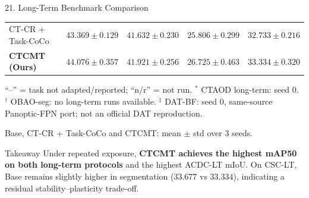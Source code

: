 \documentclass[aspectratio=169,11pt]{beamer}
\begin{document}
\begin{frame}{21. Long-Term Benchmark Comparison}
\begin{tabular}{lcccc}
CT-CR + Task-CoCo
& $43.369\pm0.129$
& $41.632\pm0.230$
& $25.806\pm0.299$
& $32.733\pm0.216$
\\

\textbf{CTCMT (Ours)}
& $\mathbf{44.076\pm0.357}$
& $\mathbf{41.921\pm0.256}$
& $\mathbf{26.725\pm0.463}$
& $33.334\pm0.320$
\\

\bottomrule
\end{tabular}

\vspace{0.02cm}

{\fontsize{5.2}{5.8}\selectfont
\raggedright

``--'' = task not adapted/reported; ``n/r'' = not run.
$^\ast$ CTAOD long-term: seed 0.
$^\dagger$ OBAO-seg: no long-term runs available.
$^\ddagger$ DAT-BF: seed 0, same-source Panoptic-FPN port; not an official DAT reproduction.

Base, CT-CR + Task-CoCo and CTCMT: mean $\pm$ std over 3 seeds.
\par
}

\vspace{-0.04cm}

\begin{block}{Takeaway}
\fontsize{5.8}{6.4}\selectfont
Under repeated exposure, \textbf{CTCMT achieves the highest mAP50 on both
long-term protocols} and the highest ACDC-LT mIoU.
On CSC-LT, Base remains slightly higher in segmentation
($33.677$ vs $33.334$), indicating a residual stability--plasticity trade-off.
\end{block}

\end{frame}






\end{document}
